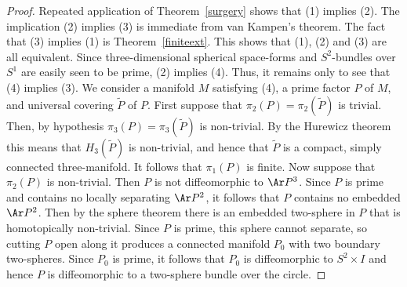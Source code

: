 \begin{proof}
Repeated application of Theorem~\ref{surgery} shows that (1) implies
(2). The implication (2) implies (3) is immediate from van Kampen's
theorem. The fact that (3) implies (1) is Theorem~\ref{finiteext}.
This shows that (1), (2) and (3) are all equivalent. Since
three-dimensional spherical space-forms and $S^2$-bundles over $S^1$
are easily seen to be prime,  (2) implies  (4). Thus, it remains
only to see that (4) implies (3). We consider a manifold $M$
satisfying (4), a prime factor $P$ of $M$, and  universal covering
$\widetilde P$ of $P$. First suppose that $\pi_2(P)=\pi_2(\widetilde
P)$ is trivial. Then, by hypothesis $\pi_3(P)=\pi_3(\widetilde P)$
is non-trivial. By the Hurewicz theorem this means that
$H_3(\widetilde P)$ is non-trivial, and hence that $\widetilde P$ is
a compact, simply connected three-manifold. It follows that
$\pi_1(P)$ is finite. Now suppose that $\pi_2(P)$ is non-trivial.
Then $P$ is not diffeomorphic to $\Ar P^3$. Since $P$ is prime and
contains no locally separating $\Ar P^2$, it follows that $P$
contains no embedded $\Ar P^2$. Then by the sphere theorem there is
an embedded two-sphere in $P$ that is homotopically non-trivial.
Since $P$ is prime, this sphere cannot separate, so cutting $P$ open
along it produces a connected manifold $P_0$ with two boundary
two-spheres. Since $P_0$ is prime, it follows that $P_0$ is
diffeomorphic to $S^2\times I$ and hence $P$ is diffeomorphic to a
two-sphere bundle over the circle.
\end{proof}

